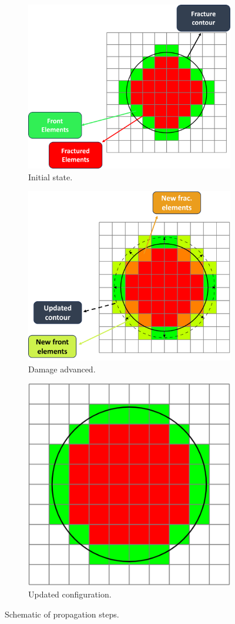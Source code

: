 \begin{figure}[h]
    \begin{subfigure}{\textwidth}
        \hspace*{1.85cm}\includegraphics[width=0.55\linewidth]{Chapter4/figures/penny_with_descriptions.png}
        \caption{Initial state.}
        \label{fig:lorem1}
    \end{subfigure}

    \begin{subfigure}{\textwidth}    
        \hspace*{2.35cm}\includegraphics[width=0.51\linewidth]{Chapter4/figures/larger_penny_with_descriptions.png}
        \caption{Damage advanced.}
        \label{fig:lorem2}
    \end{subfigure}
    
    \begin{subfigure}{\textwidth}
        \centering
        \includegraphics[width=0.33\linewidth]{Chapter4/figures/larger_penny.png}
        \caption{Updated configuration.}
        \label{fig:lorem3}
    \end{subfigure}
    \caption{Schematic of propagation steps.}
    \label{fig:crack_prop_steps}
\end{figure}

